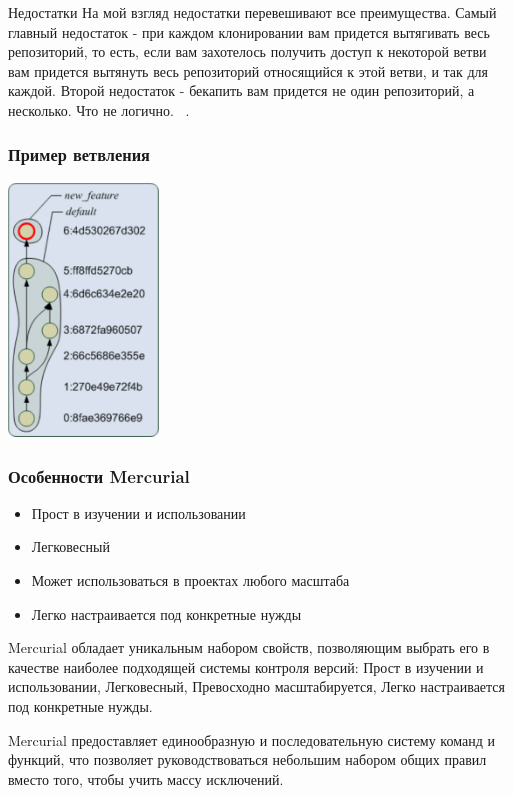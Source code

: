 \documentclass{../industrial-development}
\begin{document}
Недостатки
На мой взгляд недостатки перевешивают все преимущества. Самый главный недостаток - при каждом клонировании вам придется вытягивать весь репозиторий, то есть, если вам захотелось получить доступ к некоторой ветви вам придется вытянуть весь репозиторий относящийся к этой ветви, и так для каждой. Второй недостаток - бекапить вам придется не один репозиторий, а несколько. Что не логично. ~\cite{MercurialBrainIt}.

\begin{frame} \frametitle{Пример ветвления}
  \centerline{\includegraphics[width=0.3\textwidth]{branching-mercurial.pdf}}
\end{frame}

\begin{frame} \frametitle{Особенности Mercurial}
  
  \begin{itemize}
  \item Прост в изучении и использовании
  \item Легковесный
  \item Может использоваться в проектах любого масштаба
  \item Легко настраивается под конкретные нужды
  \end{itemize}
\end{frame}

\lecturenotes

Mercurial обладает уникальным набором свойств, позволяющим выбрать его в качестве наиболее подходящей системы контроля версий: Прост в изучении и использовании, Легковесный, Превосходно масштабируется, Легко настраивается под конкретные нужды.

Mercurial предоставляет единообразную и последовательную систему команд и функций, что позволяет руководствоваться небольшим набором общих правил вместо того, чтобы учить массу исключений.
\end{document}
